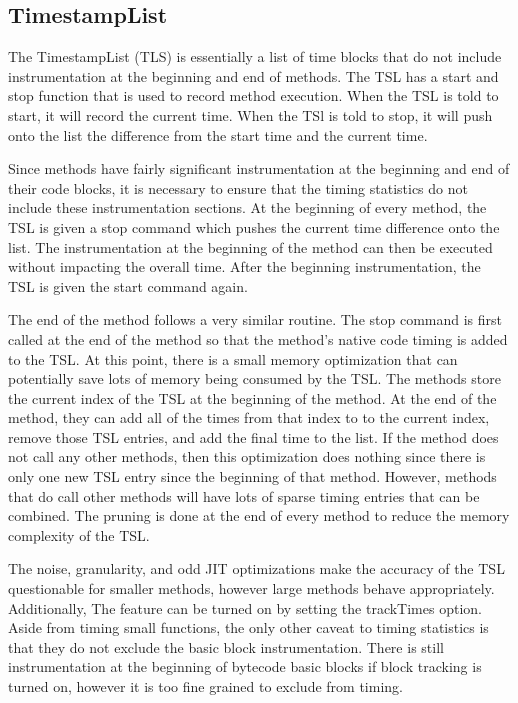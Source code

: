\documentclass[conference,10pt,twocolumn]{./IEEE/IEEEtran}
\begin{document}
\subsection{TimestampList}
The TimestampList (TLS) is essentially a list of time blocks that do not include instrumentation at the beginning and end of methods.
The TSL has a start and stop function that is used to record method execution.
When the TSL is told to start, it will record the current time.
When the TSl is told to stop, it will push onto the list the difference from the start time and the current time.

Since methods have fairly significant instrumentation at the beginning and end of their code blocks, it is necessary to ensure that the timing statistics do not include these instrumentation sections.
At the beginning of every method, the TSL is given a stop command which pushes the current time difference onto the list.
The instrumentation at the beginning of the method can then be executed without impacting the overall time.
After the beginning instrumentation, the TSL is given the start command again.

The end of the method follows a very similar routine.
The stop command is first called at the end of the method so that the method's native code timing is added to the TSL.
At this point, there is a small memory optimization that can potentially save lots of memory being consumed by the TSL.
The methods store the current index of the TSL at the beginning of the method.
At the end of the method, they can add all of the times from that index to to the current index, remove those TSL entries, and add the final time to the list.
If the method does not call any other methods, then this optimization does nothing since there is only one new TSL entry since the beginning of that method.
However, methods that do call other methods will have lots of sparse timing entries that can be combined.
The pruning is done at the end of every method to reduce the memory complexity of the TSL.

The noise, granularity, and odd JIT optimizations make the accuracy of the TSL questionable for smaller methods, however large methods behave appropriately.
Additionally, The feature can be turned on by setting the trackTimes option.
Aside from timing small functions, the only other caveat to timing statistics is that they do not exclude the basic block instrumentation.
There is still instrumentation at the beginning of bytecode basic blocks if block tracking is turned on, however it is too fine grained to exclude from timing.
\end{document}
